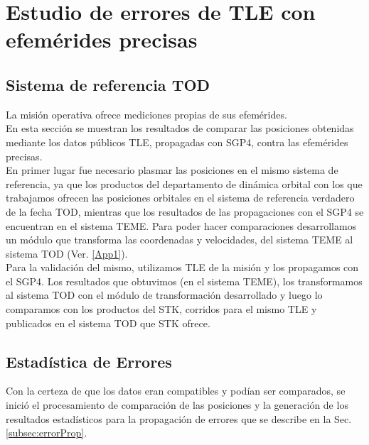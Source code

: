 \section{Estudio de errores de TLE con efem\'erides precisas}
\subsection*{Sistema de referencia TOD}
La misi\'on operativa ofrece mediciones propias de sus efem\'erides.\\
En esta secci\'on se muestran los resultados de comparar las posiciones obtenidas mediante los datos p\'ublicos TLE, propagadas con SGP4, contra las efem\'erides precisas.\\ 

En primer lugar fue necesario plasmar las posiciones en el mismo sistema de referencia, ya que los productos del departamento de din\'amica orbital con los que trabajamos ofrecen las posiciones orbitales en el sistema de referencia verdadero de la fecha \ac{TOD}, mientras que los resultados de las propagaciones con el SGP4 se encuentran en el sistema \ac{TEME}. Para poder hacer comparaciones desarrollamos un m\'odulo que transforma las coordenadas y velocidades, del sistema TEME al sistema TOD (Ver. \ref{App1}).\\


Para la validaci\'on del mismo, utilizamos TLE de la misi\'on y los propagamos con el SGP4. Los resultados que obtuvimos (en el sistema TEME), los transformamos al sistema TOD con el m\'odulo de transformaci\'on desarrollado y luego lo comparamos con los productos del STK, corridos para el mismo TLE y publicados en el sistema TOD que STK ofrece.

\subsection*{Estad\'istica de Errores}
Con la certeza de que los datos eran compatibles y pod\'ian ser comparados, se inici\'o el procesamiento de comparaci\'on de las posiciones y la generaci\'on de los resultados estad\'isticos para la propagaci\'on de errores que se describe en la Sec. \ref{subsec:errorProp}.

